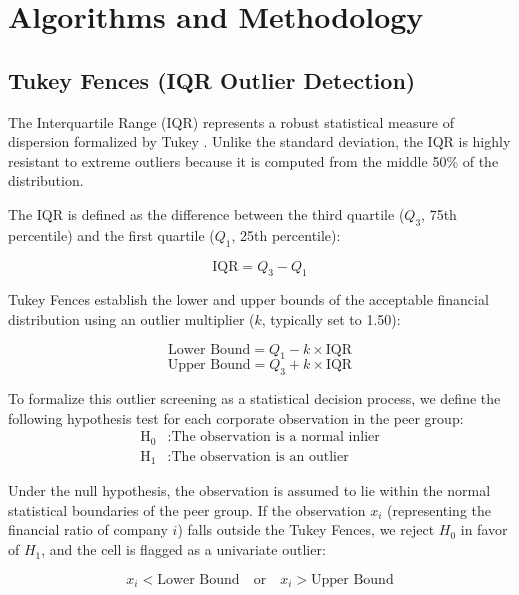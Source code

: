 \chapter{Algorithms and Methodology}
\label{ch:algorithms}

\section{Tukey Fences (IQR Outlier Detection)}
The Interquartile Range (IQR) represents a robust statistical measure of dispersion formalized by Tukey \cite{tukey1977exploratory}. Unlike the standard deviation, the IQR is highly resistant to extreme outliers because it is computed from the middle 50\% of the distribution.

The IQR is defined as the difference between the third quartile ($Q_3$, 75th percentile) and the first quartile ($Q_1$, 25th percentile):

\begin{equation}
    \text{IQR} = Q_3 - Q_1
\end{equation}

Tukey Fences establish the lower and upper bounds of the acceptable financial distribution using an outlier multiplier ($k$, typically set to 1.50):

\begin{equation}
    \text{Lower Bound} = Q_1 - k \times \text{IQR}
\end{equation}
\begin{equation}
    \text{Upper Bound} = Q_3 + k \times \text{IQR}
\end{equation}

To formalize this outlier screening as a statistical decision process, we define the following hypothesis test for each corporate observation in the peer group:
\begin{align}
    \text{H}_0 &: \text{The observation is a normal inlier} \\
    \text{H}_1 &: \text{The observation is an outlier}
\end{align}

Under the null hypothesis, the observation is assumed to lie within the normal statistical boundaries of the peer group. If the observation $x_i$ (representing the financial ratio of company $i$) falls outside the Tukey Fences, we reject $H_0$ in favor of $H_1$, and the cell is flagged as a univariate outlier:

\begin{equation}
    x_i < \text{Lower Bound} \quad \text{or} \quad x_i > \text{Upper Bound}
\end{equation}

